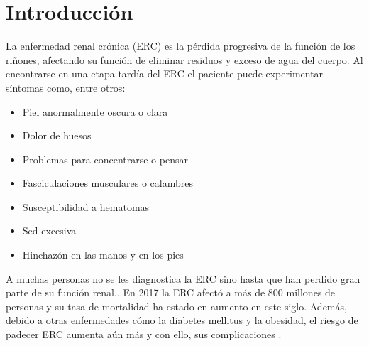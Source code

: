 \documentclass{Academic}
\begin{document}
\myabstract{}
\renewcommand{\myTitle}{Uso de Redes Bayesianas Gaussianas para comprender 
el efecto de biomarcadores en la Enfermedad renal crónica: Un análisis probabilístico}
\renewcommand{\MyAuthors}{%
    Jessica Milagros Cordero Rivera$^{1}$ \quad
    Diego Rodrigo González Ramírez$^{1}$\\[0.2em]
    Jose Ángel Lechuga Carrasco$^{1}$ \quad
    Julio Lizárraga Beltrán$^{1}$
}

\renewcommand{\MyAffiliations}{%
    $^{1}$Escuela de Ingeniería y Ciencias
}

\renewcommand{\AuthorIDs}{%
    A01647083 \;|\; A01647198 \;|\; A00228198 \;|\; A01743628
}

\renewcommand{\ShortAuthors}{Cordero Rivera et al.}

\renewcommand{\Keywords}{enfermedad crónica renal, red bayesiana, red bayesiana gaussiana, asistencia médica, análisis probabilístico}
\maketitle
\onehalfspacing

\section{Introducción}


La enfermedad renal crónica (ERC) es la pérdida progresiva de la función de los riñones, 
afectando su función de eliminar residuos y exceso de agua del cuerpo. Al encontrarse
en una etapa tardía del ERC el paciente puede experimentar síntomas como, entre otros:

\begin{itemize}
  \item Piel anormalmente oscura o clara
  \item Dolor de huesos
  \item Problemas para concentrarse o pensar
  \item Fasciculaciones musculares o calambres
  \item Susceptibilidad a hematomas
  \item Sed excesiva
  \item Hinchazón en las manos y en los pies
\end{itemize}

A muchas personas no se les diagnostica la ERC sino hasta que han perdido 
gran parte de su función renal.\cite{definicion}. 
En 2017 la ERC afectó a más de 800 millones de personas y su tasa de mortalidad ha 
estado en aumento en este siglo. Además, debido a otras enfermedades cómo la diabetes mellitus 
y la obesidad, el riesgo de padecer ERC aumenta aún más y con ello, sus complicaciones \cite{Csaba}.
\end{document}
